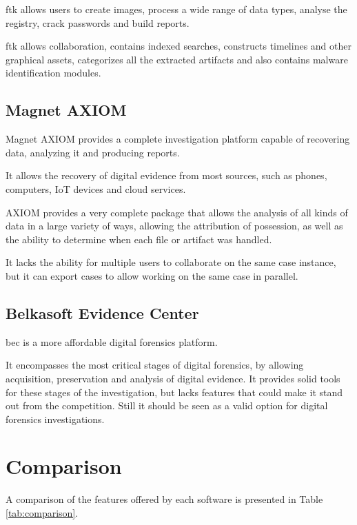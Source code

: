 \acrshort{ftk} allows users to create images, process a wide range of data types, analyse the registry, crack passwords and build reports. 

\acrshort{ftk} allows collaboration, contains indexed searches, constructs timelines and other graphical assets, categorizes all the extracted artifacts and also contains malware identification modules.

\subsection{Magnet AXIOM}

Magnet AXIOM \cite{axiom} provides a complete investigation platform capable of recovering data, analyzing it and producing reports.

It allows the recovery of digital evidence from most sources, such as phones, computers, IoT devices and cloud services.

AXIOM provides a very complete package that allows the analysis of all kinds of data in a large variety of ways, allowing the attribution of possession, 
as well as the ability to determine when each file or artifact was handled.

It lacks the ability for multiple users to collaborate on the same case instance, but it can export cases to allow working on the same case in parallel.

\subsection{Belkasoft Evidence Center}

\acrfull{bec} \cite{bec} is a more affordable digital forensics platform.

It encompasses the most critical stages of digital forensics, by allowing acquisition, preservation and analysis of digital evidence.
It provides solid tools for these stages of the investigation, but lacks features that could make it stand out from the competition. 
Still it should be seen as a valid option for digital forensics investigations.

\section{Comparison}

A comparison of the features offered by each software is presented in Table \ref{tab:comparison}.

